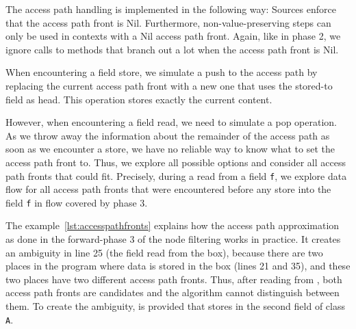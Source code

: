 The access path handling is implemented in the following way:
Sources enforce that the access path front is Nil.
Furthermore, non-value-preserving steps can only be used in contexts with
a Nil access path front.
Again, like in phase 2, we ignore calls to methods that branch out a lot when the
access path front is Nil.

When encountering a field store, we simulate a push to the access path by replacing 
the current access path front with a new one that uses the stored-to field 
as head.
This operation stores exactly the current content.

However, when encountering a field read, we need to simulate a pop operation.
As we throw away the information about the remainder of the access path as soon as 
we encounter a store, we have no reliable way to know what to set the access path front 
to.
Thus, we explore all possible options and consider all access path fronts that could fit.
Precisely, during a read from a field \texttt{f},
we explore data flow for all access path fronts that were encountered before 
any store into the field \texttt{f} in flow covered by phase 3.

The example~\autoref{lst:accesspathfronts} explains how the access path approximation as done in the forward-phase 
3 of the node filtering works in practice.
It creates an ambiguity in line 25 (the field read from the box),
because there are two places in the program where data is stored in the box 
(lines 21 and 35), and these two places have two different access path fronts.
Thus, after reading from , both access path fronts are candidates 
and the algorithm cannot distinguish between them.
To create the ambiguity,  is provided that stores 
in the second field of class \texttt{A}.

